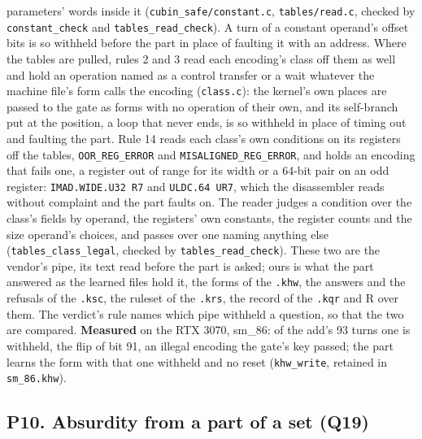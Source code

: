 parameters' words inside it (\texttt{cubin\_\allowbreak{}safe/\allowbreak{}constant.\allowbreak{}c}, \texttt{tables/\allowbreak{}read.\allowbreak{}c}, checked by \texttt{constant\_\allowbreak{}check} and \texttt{tables\_\allowbreak{}read\_\allowbreak{}check}). A turn of a constant operand's offset bits is so withheld before the part in place of faulting it with an address. Where the tables are pulled, rules 2 and 3 read each encoding's class off them as well and hold an operation named as a control transfer or a wait whatever the machine file's form calls the encoding (\texttt{class.\allowbreak{}c}): the kernel's own places are passed to the gate as forms with no operation of their own, and its self-branch put at the position, a loop that never ends, is so withheld in place of timing out and faulting the part. Rule 14 reads each class's own conditions on its registers off the tables, \texttt{OOR\_\allowbreak{}REG\_\allowbreak{}ERROR} and \texttt{MISALIGNED\_\allowbreak{}REG\_\allowbreak{}ERROR}, and holds an encoding that fails one, a register out of range for its width or a 64-bit pair on an odd register: \texttt{IMAD.\allowbreak{}WIDE.\allowbreak{}U32 R7} and \texttt{ULDC.\allowbreak{}64 UR7}, which the disassembler reads without complaint and the part faults on. The reader judges a condition over the class's fields by operand, the registers' own constants, the register counts and the size operand's choices, and passes over one naming anything else (\texttt{tables\_\allowbreak{}class\_\allowbreak{}legal}, checked by \texttt{tables\_\allowbreak{}read\_\allowbreak{}check}). These two are the vendor's pipe, its text read before the part is asked; ours is what the part answered as the learned files hold it, the forms of the \texttt{.\allowbreak{}khw}, the answers and the refusals of the \texttt{.\allowbreak{}ksc}, the ruleset of the \texttt{.\allowbreak{}krs}, the record of the \texttt{.\allowbreak{}kqr} and R over them. The verdict's rule names which pipe withheld a question, so that the two are compared. \textbf{Measured} on the RTX 3070, sm\_\allowbreak{}86: of the add's 93 turns one is withheld, the flip of bit 91, an illegal encoding the gate's key passed; the part learns the form with that one withheld and no reset (\texttt{khw\_\allowbreak{}write}, retained in \texttt{sm\_\allowbreak{}86.\allowbreak{}khw}).

\subsection{\texorpdfstring{P10. Absurdity from a part of a set (Q19)}{P10. Absurdity from a part of a set (Q19)}}

